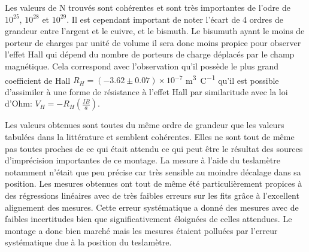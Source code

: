 Les valeurs de N trouvés sont cohérentes et sont très importantes de l'odre de \(10^{25}\), \(10^{28}\) et \(10^{29}\). Il est cependant important de noter l'écart de 4 ordres de grandeur entre l'argent et le cuivre, et le bismuth. Le bisumuth ayant le moins de porteur de charges par unité de volume il sera donc moins propice pour observer l'effet Hall qui dépend du nombre de porteurs de charge déplacés par le champ magnétique. Cela correspond avec l'observation qu'il possède le plus grand coefficient de Hall \(R_H = (-3.62 \pm 0.07) \times 10^{-7}\) \si{\cubic \meter \per \coulomb} qu'il est possible d'assimiler à une forme de résistance à l'effet Hall par similaritude avec la loi d'Ohm: \(V_H = -R_H (\frac{IB}{a})\).

Les valeurs obtenues sont toutes du même ordre de grandeur que les valeurs tabulées dans la littérature \cite{notice} et semblent cohérentes. Elles ne sont tout de même pas toutes proches de ce qui était attendu ce qui peut être le résultat des sources d'imprécision importantes de ce montage. La mesure à l'aide du teslamètre notamment n'était que peu précise car très sensible au moindre décalage dans sa position. Les mesures obtenues ont tout de même été particulièrement propices à des régressions linéaires avec de très faibles erreurs sur les fits grâce à l'excellent alignement des mesures. Cette erreur systématique a donné des mesures avec de faibles incertitudes bien que significativement éloignées de celles attendues. Le montage a donc bien marché mais les mesures étaient polluées par l'erreur systématique due à la position du teslamètre.